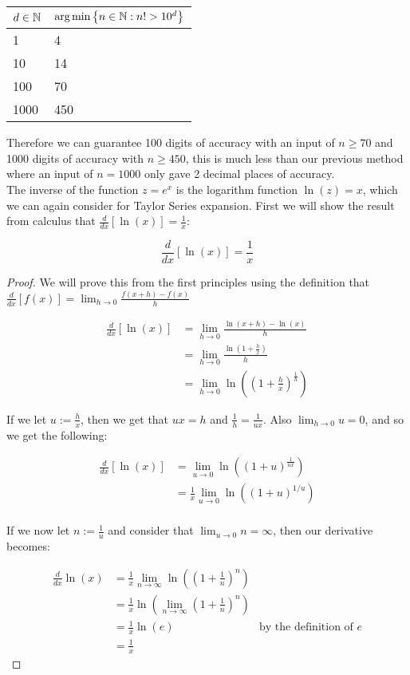 \begin{center}
\begin{tabular}{|l|l|}
\hline
\(d \in \mathbb{N}\) 
	& \(\textrm{arg}\min\left\{n \in \mathbb{N} : n! > 10^d\right\}\)\\\hline
1 & 4\\\hline
10 & 14 \\\hline
100 & 70 \\\hline
1000 & 450\\\hline
\end{tabular}
\end{center}

Therefore we can guarantee 100 digits of accuracy with an input of \(n \ge 70\) and 1000 digits of accuracy with \(n \ge 450\), this is much less than our previous method where an input of \(n = 1000\) only gave 2 decimal places of accuracy.\\

The inverse of the function \(z = e^x\) is the logarithm function \(\ln(z) = x\), which we can again consider for Taylor Series expansion. First we will show the result from calculus that \(\frac{d}{dx}[\ln(x)] = \frac{1}{x}\):

\begin{nat log dif}
\[\frac{d}{dx}[\ln(x)] = \frac{1}{x}\]
\end{nat log dif}
\begin{proof}
We will prove this from the first principles using the definition that \(\frac{d}{dx}[f(x)] = \lim_{h\to 0} \frac{f(x + h) - f(x)}{h}\)

\begin{align*}
	\frac{d}{dx}[\ln(x)] 
		&= \lim_{h\to 0}\frac{\ln(x + h) - \ln(x)}{h}\\
		&= \lim_{h\to 0}\frac{\ln(1 + \frac{h}{x})}{h}\\
		&= \lim_{h\to 0}\ln\left((1+\frac{h}{x})^{\frac{1}{h}}\right)
\end{align*}

If we let \(u := \frac{h}{x}\), then we get that \(ux = h\) and \(\frac{1}{h} = \frac{1}{ux}\). Also \(\lim_{h\to 0}u = 0\), and so we get the following:

\begin{align*}
	\frac{d}{dx}[\ln(x)]
		&= \lim_{u\to 0}\ln((1+u)^{\frac{1}{ux}})\\
		&= \frac{1}{x}\lim_{u\to 0}\ln((1+u)^{1/u})\\
\end{align*}

If we now let \(n := \frac{1}{u}\) and consider that \(\lim_{u\to 0} n = \infty\), then our derivative becomes:

\begin{align*}
	\frac{d}{dx}\ln(x) 
		&= \frac{1}{x}\lim_{n\to\infty}\ln((1 + \frac{1}{n})^n)\\
		&= \frac{1}{x}\ln(\lim_{n\to\infty}(1+\frac{1}{n})^n)\\
		&= \frac{1}{x}\ln(e) &\textrm{by the definition of \(e\)}\\
		&= \frac{1}{x}
\end{align*}
\end{proof}

